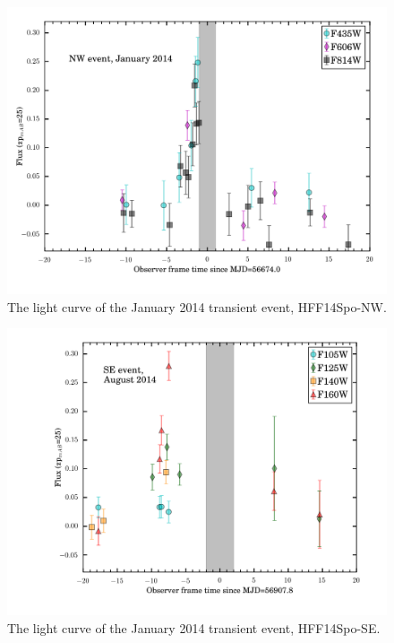 \begin{figure}
\begin{center}
\includegraphics[width=\columnwidth]{figures/m0416_transient_NW.png}
\caption{The light curve of the January 2014 transient event, HFF14Spo-NW.}
\end{center}
\end{figure}


\begin{figure}
\begin{center}
\includegraphics[width=\columnwidth]{figures/m0416_transient_SE.png}
\caption{The light curve of the January 2014 transient event, HFF14Spo-SE.}
\end{center}
\end{figure}

